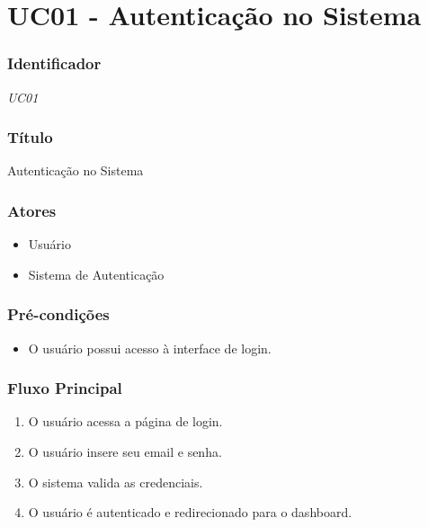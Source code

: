\chapter{UC01 - Autenticação no Sistema}
\label{apendiceUC01}

\subsection*{Identificador}
\textit{UC01}

\subsection*{Título}
Autenticação no Sistema

\subsection*{Atores}
\begin{addmargin}[1.5cm]{0cm}
	\begin{itemize}
		\item Usuário
		\item Sistema de Autenticação
	\end{itemize}
\end{addmargin}


\subsection*{Pré-condições}
\begin{addmargin}[1.5cm]{0cm}
	\begin{itemize}
		\item O usuário possui acesso à interface de login.
	\end{itemize}
\end{addmargin}

\subsection*{Fluxo Principal}
\begin{addmargin}[1.5cm]{0cm}
	\begin{enumerate}
		\item O usuário acessa a página de login.
		\item O usuário insere seu email e senha.
		\item O sistema valida as credenciais.
		\item O usuário é autenticado e redirecionado para o dashboard.
	\end{enumerate}
\end{addmargin}

